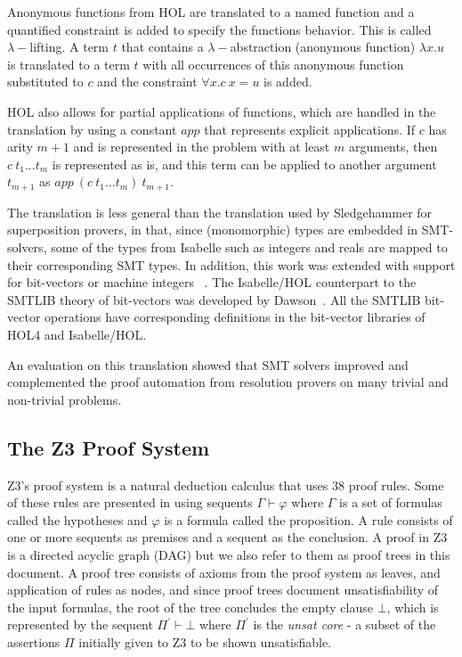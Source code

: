 \documentclass{article}
\begin{document}
		Anonymous functions from HOL are translated 
		to a named function and a quantified constraint
		is added to specify the functions behavior.
		This is called $\lambda-$lifting.
		A term $t$ that contains a $\lambda-$abstraction
		(anonymous function) $\lambda x.u$ is translated 
		to a term $t$ with all occurrences of this 
		anonymous function substituted to $c$ and 
		the constraint $\forall x. c\ x = u$ is added.

		HOL also allows for partial applications of 
		functions, which are handled in the translation
		by using a constant $app$ that represents 
		explicit applications. If $c$ has arity 
		$m+1$ and is represented in the problem 
		with at least $m$ arguments, then 
		$c\ t_1 ... t_m$ is represented as is, 
		and this term can be applied to another 
		argument $t_{m+1}$ as 
		$app\ (c\ t_1 ... t_m)\ t_{m+1}$.
		
		The translation is less general than the 
		translation used by Sledgehammer for 
		superposition provers, in that, since (monomorphic) 
		types are embedded in SMT-solvers, some of the 
		types from Isabelle such as integers and reals 
		are mapped to their corresponding SMT types.
		In addition, this work was extended with 
		support for bit-vectors or machine integers
		~\cite{10.1007/978-3-642-25379-9_15}. The 
		Isabelle/HOL counterpart to the SMTLIB 
		theory of bit-vectors was developed by 
		Dawson~\cite{DAWSON200955}. All the SMTLIB
		bit-vector operations have corresponding 
		definitions in the bit-vector libraries of 
		HOL4 and Isabelle/HOL.
		
		An evaluation on this translation showed that SMT 
		solvers improved and complemented the proof automation 
		from resolution provers on many trivial and non-trivial 
		problems.
		
	\subsection{The Z3 Proof System}
		Z3's proof system is a natural deduction 
		calculus that uses 38 proof rules. Some of 
		these rules are presented in 
		using sequents $\Gamma \vdash \varphi$ where 
		$\Gamma$ is a set of formulas called the hypotheses
		and $\varphi$ is a formula called the proposition. 
		A rule consists of one or more sequents as 
		premises and a sequent as the conclusion. A
		proof in Z3 is a directed acyclic graph (DAG)
		but we also refer to them as proof trees in
		this document. A proof tree consists of axioms 
		from the proof system as leaves, and application 
		of rules as nodes, and since proof trees 
		document unsatisfiability of the input 
		formulas, the root of the tree concludes the 
		empty clause $\bot$, which is represented by 
		the sequent $\Pi^\prime \vdash \bot$ where 
		$\Pi^\prime$ is the \textit{unsat core} - 
		a subset of the assertions $\Pi$
		initially given to Z3 to be shown unsatisfiable.
		
\end{document}
